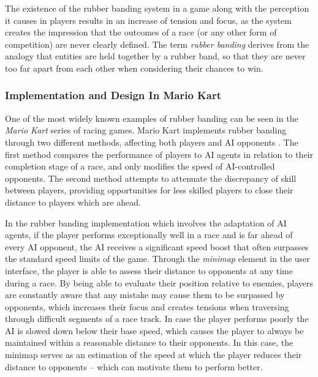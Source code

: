 The existence of the rubber banding system in a game along with the perception it causes in players results in an increase of tension and focus, as the system creates the impression that the outcomes of a race (or any other form of competition) are never clearly defined. The term \emph{rubber banding} derives from the analogy that entities are held together by a rubber band, so that they are never too far apart from each other when considering their chances to win.

\subsubsection{Implementation and Design In Mario Kart}

One of the most widely known examples of rubber banding can be seen in the \emph{Mario Kart} series of racing games. Mario Kart implements rubber banding through two different methods, affecting both players and AI opponents \cite{website_rubberbandingmariokart}. The first method compares the performance of players to AI agents in relation to their completion stage of a race, and only modifies the speed of AI-controlled opponents. The second method attempts to attenuate the discrepancy of skill between players, providing opportunities for less skilled players to close their distance to players which are ahead.

In the rubber banding implementation which involves the adaptation of AI agents, if the player performs exceptionally well in a race and is far ahead of every AI opponent, the AI receives a significant speed boost that often surpasses the standard speed limits of the game. Through the \emph{minimap} element in the user interface, the player is able to assess their distance to opponents at any time during a race. By being able to evaluate their position relative to enemies, players are constantly aware that any mistake may cause them to be surpassed by opponents, which increases their focus and creates tensions when traversing through difficult segments of a race track. In case the player performs poorly the AI is slowed down below their base speed, which causes the player to always be maintained within a reasonable distance to their opponents. In this case, the minimap serves as an estimation of the speed at which the player reduces their distance to opponents -- which can motivate them to perform better.

